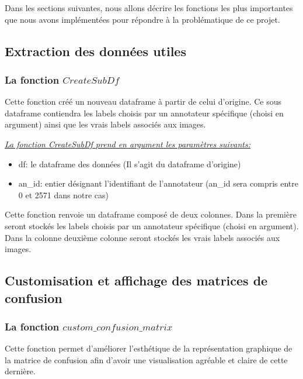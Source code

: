 \documentclass[a4paper,french,10pt]{article}
\begin{document}
	\vspace{2mm}
	Dans les sections suivantes, nous allons décrire les fonctions les plus importantes que nous avons implémentées pour répondre à la problématique de ce projet.
	
	\subsection{Extraction des données utiles}
	\subsubsection{La fonction $CreateSubDf$}
	Cette fonction créé un nouveau dataframe à partir de celui d'origine. Ce sous dataframe contiendra les labels choisis par un annotateur spécifique (choisi en argument) ainsi que les vrais labels associés aux images.
	
	
	
	\underline{\textit{La fonction CreateSubDf prend en argument les paramètres suivants:}} \\
	\begin{itemize}
		\item df: le dataframe des données (Il s'agit du dataframe d'origine) \\
		\item an\_id:  entier désignant l'identifiant de l'annotateur (an\_id sera compris entre 0 et 2571 dans notre cas)
	\end{itemize}

	\vspace{2mm}

	Cette fonction renvoie un dataframe composé de deux colonnes. Dans la première seront stockés les labels choisis par un annotateur spécifique (choisi en argument). Dans la colonne deuxième colonne seront stockés les vrais labels associés aux images.
	
	\subsection{Customisation et affichage des matrices de confusion}
	
	\subsubsection{La fonction $custom\_confusion\_matrix$}
	Cette fonction permet d'améliorer l'esthétique de la représentation graphique de la matrice de confusion afin d'avoir une visualisation agréable et claire de cette dernière. 
	
\end{document}
